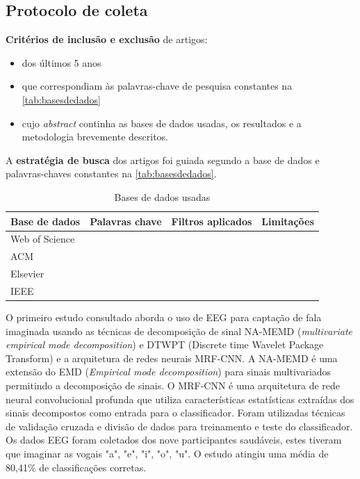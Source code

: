 		\subsection{Protocolo de coleta}
		
			\par \textbf{Critérios de inclusão e exclusão} de artigos:
			\begin{itemize}
				\item dos últimos 5 anos
				\item que correspondiam às palavras-chave de pesquisa constantes na \autoref{tab:basesdedados}
				\item cujo \textit{abstract} continha as bases de dados usadas, os resultados e a metodologia brevemente descritos.
			\end{itemize}
			
			
			\par A \textbf{estratégia de busca} dos artigos foi guiada segundo a base de dados e palavras-chaves constantes na \autoref{tab:basesdedados}.
			\begin{table}[H]
				\begin{center}
					\caption[Bases de dados usadas]{Bases de dados usadas}
					\begin{tabular}{|l|l|l|l|}
						\hline
						Base de dados & Palavras chave & Filtros aplicados & Limitações \\
						\hline
						Web of Science & & & \\
						\hline
						ACM & & & \\
						\hline
						Elsevier & & & \\
						\hline
						IEEE & & & \\
						\hline
					\end{tabular}
					\label{tab:basesdedados}
				\end{center}
			\end{table}
		
			\par O primeiro estudo consultado \cite{ParkHyeong-jun2023Mcoi} aborda o uso de EEG para captação de fala imaginada usando as técnicas de decomposição de sinal NA-MEMD (\textit{multivariate empirical mode decomposition}) e DTWPT (Discrete time Wavelet Package Transform) e a arquitetura de redes neurais MRF-CNN. A NA-MEMD é uma extensão do EMD (\textit{Empirical mode decomposition}) para sinais multivariados permitindo a decomposição de sinais. O MRF-CNN é uma arquitetura de rede neural convolucional profunda que utiliza características estatísticas extraídas dos sinais decompostos como entrada para o classificador. Foram utilizadas técnicas de validação cruzada e divisão de dados para treinamento e teste do classificador. Os dados EEG foram coletados dos nove participantes saudáveis, estes tiveram que imaginar as vogais "a", "e", "i", "o", "u". O estudo atingiu uma média de 80,41\% de classificações corretas.
			
